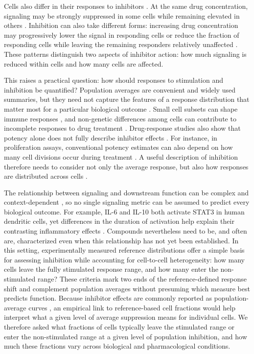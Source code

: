 \documentclass[11pt]{article}
\begin{document}
Cells also differ in their responses to inhibitors \citep{krutzik2008high,bodenmiller2012multiplexed}. At the same drug concentration, signaling may be strongly suppressed in some cells while remaining elevated in others \citep{kinnunen2024characterizing}. Inhibition can also take different forms: increasing drug concentration may progressively lower the signal in responding cells or reduce the fraction of responding cells while leaving the remaining responders relatively unaffected \citep{vogel2016dichotomy}. These patterns distinguish two aspects of inhibitor action: how much signaling is reduced within cells and how many cells are affected.

This raises a practical question: how should responses to stimulation and inhibition be quantified? Population averages are convenient and widely used summaries, but they need not capture the features of a response distribution that matter most for a particular biological outcome \citep{gough2017biologically}. Small cell subsets can shape immune responses \citep{satija2014heterogeneity,shalek2014single}, and non-genetic differences among cells can contribute to incomplete responses to drug treatment \citep{niepel2009non,aissa2021singlecell}. Drug-response studies also show that potency alone does not fully describe inhibitor effects \citep{fallahi2013metrics}. For instance, in proliferation assays, conventional potency estimates can also depend on how many cell divisions occur during treatment \citep{hafner2016growth}. A useful description of inhibition therefore needs to consider not only the average response, but also how responses are distributed across cells \citep{lun2020profiling}.

The relationship between signaling and downstream function can be complex and context-dependent \citep{cui2024dictionary}, so no single signaling metric can be assumed to predict every biological outcome. For example, IL-6 and IL-10 both activate STAT3 in human dendritic cells, yet differences in the duration of activation help explain their contrasting inflammatory effects \citep{braun2013cytokine}. Compounds nevertheless need to be, and often are,  characterized even when this relationship has not yet been established. In this setting, experimentally measured reference distributions offer a simple basis for assessing inhibition while accounting for cell-to-cell heterogeneity: how many cells leave the fully stimulated response range, and how many enter the non-stimulated range? These criteria mark two ends of the reference-defined response shift and complement population averages without presuming which measure best predicts function.  Because inhibitor effects are commonly reported as population-average curves \citep{mcinnes2019comparison}, an empirical link to reference-based cell fractions would help interpret what a given level of average suppression means for individual cells. We therefore asked what fractions of cells typically leave the stimulated range or enter the non-stimulated range at a given level of population inhibition, and how much these fractions vary across biological and pharmacological conditions.
\end{document}
